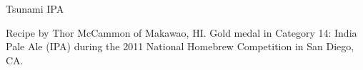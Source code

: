 \begin{recipe}{Tsunami IPA}

\begin{aboutblock}
Recipe by Thor McCammon of Makawao, HI. Gold medal in Category 14: India Pale Ale
(IPA) during the 2011 National Homebrew Competition in San Diego, CA.
\sourceaha
\end{aboutblock}


\begin{methodandtiming}

\begin{mashsteps}
\end{mashsteps}

\begin{fermentationsteps}
\end{fermentationsteps}

\end{methodandtiming}

\recipebreak

\begin{ingredientsblock}

\begin{malts}
\end{malts}

\begin{hops}
\end{hops}


\end{ingredientsblock}

\end{recipe}


